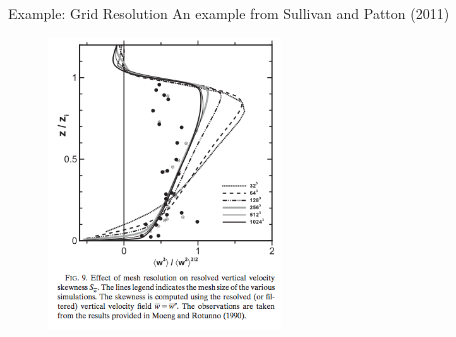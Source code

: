 \begin{frame}{Example: Grid Resolution}
An example from Sullivan and Patton (2011) 
\begin{figure}
\includegraphics[width=0.55\textwidth]{compare19}
\end{figure}
\end{frame}

